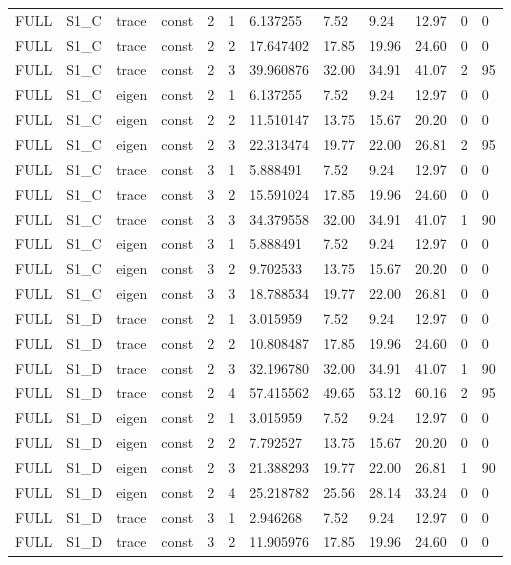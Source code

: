 \begin{tabular}{llllllllllll}
FULL & S1\_C & trace & const & 2 & 1 & 6.137255 & 7.52 & 9.24 & 12.97 & 0 & 0 \\
FULL & S1\_C & trace & const & 2 & 2 & 17.647402 & 17.85 & 19.96 & 24.60 & 0 & 0 \\
FULL & S1\_C & trace & const & 2 & 3 & 39.960876 & 32.00 & 34.91 & 41.07 & 2 & 95 \\
FULL & S1\_C & eigen & const & 2 & 1 & 6.137255 & 7.52 & 9.24 & 12.97 & 0 & 0 \\
FULL & S1\_C & eigen & const & 2 & 2 & 11.510147 & 13.75 & 15.67 & 20.20 & 0 & 0 \\
FULL & S1\_C & eigen & const & 2 & 3 & 22.313474 & 19.77 & 22.00 & 26.81 & 2 & 95 \\
FULL & S1\_C & trace & const & 3 & 1 & 5.888491 & 7.52 & 9.24 & 12.97 & 0 & 0 \\
FULL & S1\_C & trace & const & 3 & 2 & 15.591024 & 17.85 & 19.96 & 24.60 & 0 & 0 \\
FULL & S1\_C & trace & const & 3 & 3 & 34.379558 & 32.00 & 34.91 & 41.07 & 1 & 90 \\
FULL & S1\_C & eigen & const & 3 & 1 & 5.888491 & 7.52 & 9.24 & 12.97 & 0 & 0 \\
FULL & S1\_C & eigen & const & 3 & 2 & 9.702533 & 13.75 & 15.67 & 20.20 & 0 & 0 \\
FULL & S1\_C & eigen & const & 3 & 3 & 18.788534 & 19.77 & 22.00 & 26.81 & 0 & 0 \\
FULL & S1\_D & trace & const & 2 & 1 & 3.015959 & 7.52 & 9.24 & 12.97 & 0 & 0 \\
FULL & S1\_D & trace & const & 2 & 2 & 10.808487 & 17.85 & 19.96 & 24.60 & 0 & 0 \\
FULL & S1\_D & trace & const & 2 & 3 & 32.196780 & 32.00 & 34.91 & 41.07 & 1 & 90 \\
FULL & S1\_D & trace & const & 2 & 4 & 57.415562 & 49.65 & 53.12 & 60.16 & 2 & 95 \\
FULL & S1\_D & eigen & const & 2 & 1 & 3.015959 & 7.52 & 9.24 & 12.97 & 0 & 0 \\
FULL & S1\_D & eigen & const & 2 & 2 & 7.792527 & 13.75 & 15.67 & 20.20 & 0 & 0 \\
FULL & S1\_D & eigen & const & 2 & 3 & 21.388293 & 19.77 & 22.00 & 26.81 & 1 & 90 \\
FULL & S1\_D & eigen & const & 2 & 4 & 25.218782 & 25.56 & 28.14 & 33.24 & 0 & 0 \\
FULL & S1\_D & trace & const & 3 & 1 & 2.946268 & 7.52 & 9.24 & 12.97 & 0 & 0 \\
FULL & S1\_D & trace & const & 3 & 2 & 11.905976 & 17.85 & 19.96 & 24.60 & 0 & 0 \\

\end{tabular}
